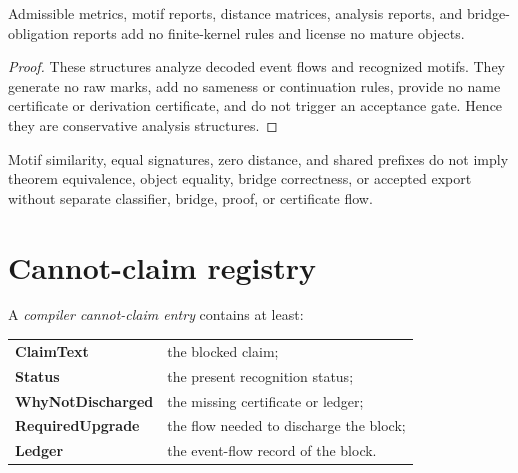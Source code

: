 \begin{theorem}
\label{thm:main-theorems-metric-conservativity}
Admissible metrics, motif reports, distance matrices, analysis reports, and bridge-obligation reports add no finite-kernel rules and license no mature objects.
\end{theorem}

\begin{proof}
These structures analyze decoded event flows and recognized motifs. They generate no raw marks, add no sameness or continuation rules, provide no name certificate or derivation certificate, and do not trigger an acceptance gate. Hence they are conservative analysis structures.
\end{proof}

\begin{corollary}
\label{cor:main-theorems-similarity-not-identity}
Motif similarity, equal signatures, zero distance, and shared prefixes do not imply theorem equivalence, object equality, bridge correctness, or accepted export without separate classifier, bridge, proof, or certificate flow.
\end{corollary}

\section{Cannot-claim registry}
\label{sec:main-theorems-cannot-claim-registry}

\begin{definition}
\label{def:main-theorems-compiler-cannot-claim-entry}
A \emph{compiler cannot-claim entry} contains at least:
\begin{center}
\begin{tabular}{ll}
\textbf{ClaimText} & the blocked claim;\\
\textbf{Status} & the present recognition status;\\
\textbf{WhyNotDischarged} & the missing certificate or ledger;\\
\textbf{RequiredUpgrade} & the flow needed to discharge the block;\\
\textbf{Ledger} & the event-flow record of the block.
\end{tabular}
\end{center}
\end{definition}

